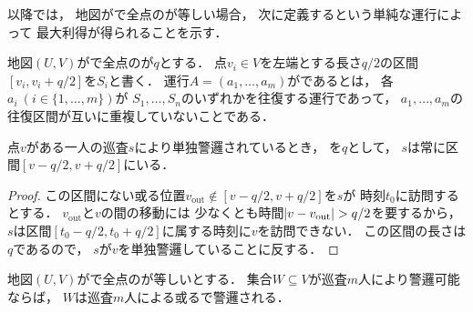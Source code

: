 以降では，
地図が{\graphLine}で全点の{\maxIdletime}が等しい場合，
次に定義するという単純な運行によって
最大利得が得られることを示す．

\begin{defi}
  \label{defi:independentSectionOperation}
  地図$(U, V)$が{\graphLine}で全点の{\maxIdletime}が$q$とする．
  点$v_i \in V$を左端とする長さ$q/2$の区間$[v_i, v_i + q/2]$を$S_i$と書く．
  運行$A = (a_1, \ldots, a_m)$がであるとは，
  各$a_i\ (i \in \{ 1, \ldots, m \})$が
  $S_1, \ldots, S_n$のいずれかを往復する運行であって，
  $a_1, \ldots, a_m$の往復区間が互いに重複していないことである．
\end{defi}


\begin{lemm}
  \label{lemm:RangeOfPatrollerOnLine}
  点$v$がある一人の巡査$s$により単独警邏されているとき，
  {\maxIdletime}を$q$として，
  $s$は常に区間$[v - q/2, v + q/2]$にいる．
\end{lemm}
\begin{proof}
  \newcommand{\vout}{v_{\mathrm{out}}}
  この区間にない或る位置$\vout \notin [v - q/2, v + q/2]$を$s$が
  時刻$t_0$に訪問するとする．
  $\vout$と$v$の間の移動には
  少なくとも時間$\abs{v - \vout} > q / 2$を要するから，
  $s$は区間$[t_0 - q / 2, t_0 + q / 2]$に属する時刻に$v$を訪問できない．
  この区間の長さは$q$であるので，
  $s$が$v$を単独警邏していることに反する．
\end{proof}


\begin{lemm}
  \label{lemm:LineUnaryIdletimeIndependentInterval}
  地図$(U, V)$が{\graphLine}で全点の{\maxIdletime}が等しいとする．
  集合$W \subseteq V$が巡査$m$人により警邏可能ならば，
  $W$は巡査$m$人による或る{\sepSectPatroll}で警邏される．
\end{lemm}

